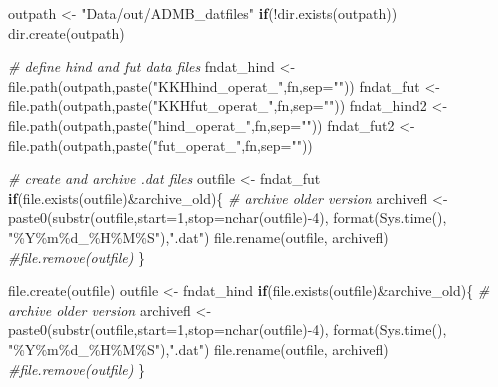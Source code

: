 \documentclass[
]{article}
\newenvironment{Shaded}{\begin{snugshade}}{\end{snugshade}}
\newcommand{\AttributeTok}[1]{\textcolor[rgb]{0.77,0.63,0.00}{#1}}
\newcommand{\CommentTok}[1]{\textcolor[rgb]{0.56,0.35,0.01}{\textit{#1}}}
\newcommand{\ControlFlowTok}[1]{\textcolor[rgb]{0.13,0.29,0.53}{\textbf{#1}}}
\newcommand{\DecValTok}[1]{\textcolor[rgb]{0.00,0.00,0.81}{#1}}
\newcommand{\FunctionTok}[1]{\textcolor[rgb]{0.00,0.00,0.00}{#1}}
\newcommand{\NormalTok}[1]{#1}
\newcommand{\OtherTok}[1]{\textcolor[rgb]{0.56,0.35,0.01}{#1}}
\newcommand{\SpecialCharTok}[1]{\textcolor[rgb]{0.00,0.00,0.00}{#1}}
\newcommand{\StringTok}[1]{\textcolor[rgb]{0.31,0.60,0.02}{#1}}
\begin{document}
\begin{Shaded}
\begin{Highlighting}[]
\NormalTok{    outpath     }\OtherTok{\textless{}{-}} \StringTok{"Data/out/ADMB\_datfiles"}
    \ControlFlowTok{if}\NormalTok{(}\SpecialCharTok{!}\FunctionTok{dir.exists}\NormalTok{(outpath)) }\FunctionTok{dir.create}\NormalTok{(outpath)}
    
  \CommentTok{\# define hind and fut data files}
\NormalTok{    fndat\_hind  }\OtherTok{\textless{}{-}} \FunctionTok{file.path}\NormalTok{(outpath,}\FunctionTok{paste}\NormalTok{(}\StringTok{"KKHhind\_operat\_"}\NormalTok{,fn,}\AttributeTok{sep=}\StringTok{""}\NormalTok{))}
\NormalTok{    fndat\_fut   }\OtherTok{\textless{}{-}} \FunctionTok{file.path}\NormalTok{(outpath,}\FunctionTok{paste}\NormalTok{(}\StringTok{"KKHfut\_operat\_"}\NormalTok{,fn,}\AttributeTok{sep=}\StringTok{""}\NormalTok{))}
\NormalTok{    fndat\_hind2 }\OtherTok{\textless{}{-}} \FunctionTok{file.path}\NormalTok{(outpath,}\FunctionTok{paste}\NormalTok{(}\StringTok{"hind\_operat\_"}\NormalTok{,fn,}\AttributeTok{sep=}\StringTok{""}\NormalTok{))}
\NormalTok{    fndat\_fut2  }\OtherTok{\textless{}{-}} \FunctionTok{file.path}\NormalTok{(outpath,}\FunctionTok{paste}\NormalTok{(}\StringTok{"fut\_operat\_"}\NormalTok{,fn,}\AttributeTok{sep=}\StringTok{""}\NormalTok{))}
    
    \CommentTok{\# create and archive .dat files}
\NormalTok{      outfile    }\OtherTok{\textless{}{-}}\NormalTok{ fndat\_fut}
    \ControlFlowTok{if}\NormalTok{(}\FunctionTok{file.exists}\NormalTok{(outfile)}\SpecialCharTok{\&}\NormalTok{archive\_old)\{   }
        \CommentTok{\# archive older version}
\NormalTok{            archivefl }\OtherTok{\textless{}{-}} \FunctionTok{paste0}\NormalTok{(}\FunctionTok{substr}\NormalTok{(outfile,}\AttributeTok{start=}\DecValTok{1}\NormalTok{,}\AttributeTok{stop=}\FunctionTok{nchar}\NormalTok{(outfile)}\SpecialCharTok{{-}}\DecValTok{4}\NormalTok{),}
                            \FunctionTok{format}\NormalTok{(}\FunctionTok{Sys.time}\NormalTok{(), }\StringTok{"\%Y\%m\%d\_\%H\%M\%S"}\NormalTok{),}\StringTok{".dat"}\NormalTok{)}
            \FunctionTok{file.rename}\NormalTok{(outfile, archivefl)}
            \CommentTok{\#file.remove(outfile)}
\NormalTok{    \}}
    
    \FunctionTok{file.create}\NormalTok{(outfile)}
\NormalTok{    outfile  }\OtherTok{\textless{}{-}}\NormalTok{ fndat\_hind}
    \ControlFlowTok{if}\NormalTok{(}\FunctionTok{file.exists}\NormalTok{(outfile)}\SpecialCharTok{\&}\NormalTok{archive\_old)\{   }
        \CommentTok{\# archive older version}
\NormalTok{            archivefl }\OtherTok{\textless{}{-}} \FunctionTok{paste0}\NormalTok{(}\FunctionTok{substr}\NormalTok{(outfile,}\AttributeTok{start=}\DecValTok{1}\NormalTok{,}\AttributeTok{stop=}\FunctionTok{nchar}\NormalTok{(outfile)}\SpecialCharTok{{-}}\DecValTok{4}\NormalTok{),}
                            \FunctionTok{format}\NormalTok{(}\FunctionTok{Sys.time}\NormalTok{(), }\StringTok{"\%Y\%m\%d\_\%H\%M\%S"}\NormalTok{),}\StringTok{".dat"}\NormalTok{)}
            \FunctionTok{file.rename}\NormalTok{(outfile, archivefl)}
            \CommentTok{\#file.remove(outfile)}
\NormalTok{    \}}
    

\end{Highlighting}
\end{Shaded}
\end{document}
